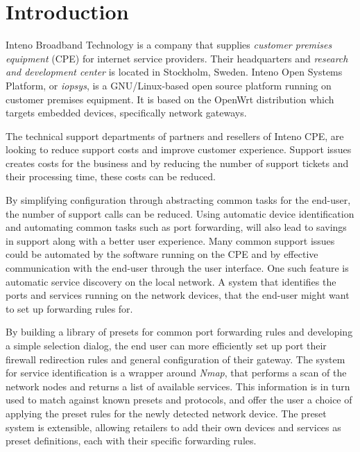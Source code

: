 \documentclass[a4paper,11pt]{kth-bcs}
\begin{document}
\chapter{Introduction}
Inteno Broadband Technology is a company that supplies \emph{customer premises equipment} (CPE) for internet service providers.  
Their headquarters and \emph{research and development center} is located in Stockholm, Sweden.
Inteno Open Systems Platform, or \emph{iopsys}, is a GNU/Linux-based open source platform running on customer premises equipment.
It is based on the OpenWrt distribution which targets embedded devices, specifically network gateways.\cite{Inteno}

The technical support departments of partners and resellers of Inteno CPE, are looking to reduce support costs and improve customer experience. 
Support issues creates costs for the business and by reducing the number of support tickets and their processing time, these costs can be reduced.

By simplifying configuration through abstracting common tasks for the end-user, the number of support calls can be reduced.
Using automatic device identification and automating common tasks such as port forwarding, will also lead to savings in support along with a better user experience.
Many common support issues could be automated by the software running on the CPE and by effective communication with the end-user through the user interface.
One such feature is automatic service discovery on the local network.
A system that identifies the ports and services running on the network devices, that the end-user might want to set up forwarding rules for.

By building a library of presets for common port forwarding rules and developing a simple selection dialog, the end user can more efficiently set up port their firewall redirection rules and general configuration of their gateway.
The system for service identification is a wrapper around \emph{Nmap}, that performs a scan of the network nodes and returns a list of available services.
This information is in turn used to match against known presets and protocols, and offer the user a choice of applying the preset rules for the newly detected network device.
The preset system is extensible, allowing retailers to add their own devices and services as preset definitions, each with their specific forwarding rules.
\end{document}
